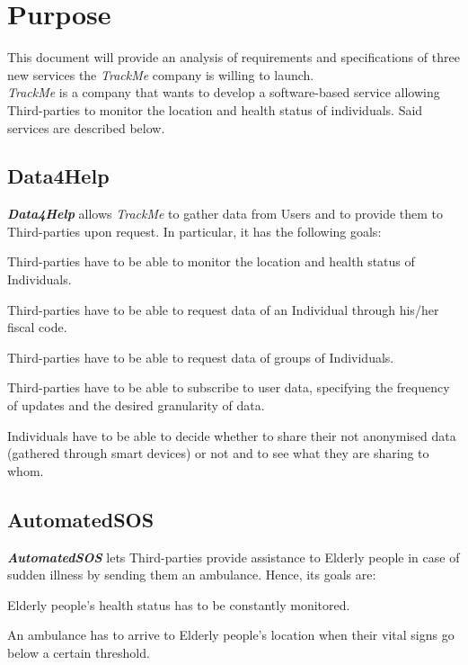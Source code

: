 \section{Purpose}
    This document will provide an analysis of requirements and specifications of three new services the \emph{TrackMe} company is willing to launch.\\
    \emph{TrackMe} is a company that wants to develop a software-based service allowing Third-parties to monitor the location and health status of individuals.
    Said services are described below.

\subsection{Data4Help}
    \textbf{\emph{Data4Help}} allows \emph{TrackMe} to gather data from Users and to provide them to Third-parties upon request. In particular, it has the following goals:
    \begin{enumerate}[label={[}G1.\arabic*{]}, leftmargin=*]
        \item \label{goal1 : monitoring} Third-parties have to be able to monitor the location and health status of Individuals.
        \begin{enumerate}[label={[}G1.\arabic{enumi}.\arabic*{]}, leftmargin=*]
            \item \label{goal1 : individual monitoring}Third-parties have to be able to request data of an Individual through his/her fiscal code.
            \item \label{goal1 : group monitoring} Third-parties have to be able to request data of groups of Individuals.
            \item \label{goal1 : subscription} Third-parties have to be able to subscribe to user data, specifying the frequency of updates and the desired granularity of data.
        \end{enumerate}
        \item \label{goal1: individual privacy} Individuals have to be able to decide whether to share their not anonymised data (gathered through smart devices) or not and to see what they are sharing to whom.
    \end{enumerate}

\subsection{AutomatedSOS}    
    \textbf{\emph{AutomatedSOS}} lets Third-parties provide assistance to Elderly people in case of sudden illness by sending them an ambulance. Hence, its goals are:
    \begin{enumerate}[label={[}G2.\arabic*{]}, leftmargin=*]
        \item \label{goal2 : status monitorin} Elderly people's health status has to be constantly monitored.
        \item \label{goal2 : ambulance} An ambulance has to arrive to Elderly people's location when their vital signs go below a certain threshold.
    \end{enumerate}
    

